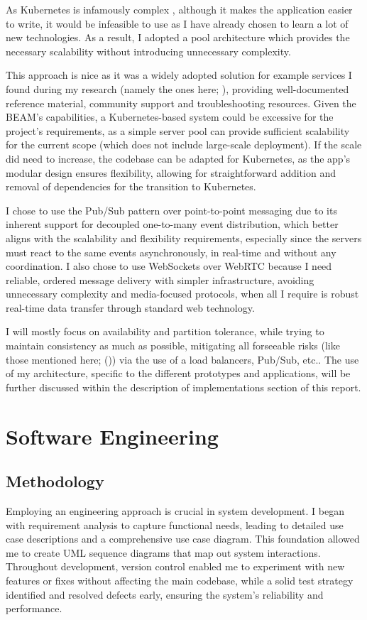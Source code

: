 \documentclass[]{final}
\begin{document}
As Kubernetes is infamously complex \cite{noauthor_why_nodate}, although it makes the application easier
to write, it would be infeasible to use as I have already chosen to learn a
lot of new technologies. As a result, I adopted a pool architecture which
provides the necessary scalability without introducing unnecessary complexity.

This approach is nice as it was a widely adopted solution for example
services I found during my research (namely the ones here; \cite{frost_making_2023, franchetti_coping_2020}), providing
well-documented reference material, community support and troubleshooting
resources.
Given the BEAM's capabilities, a Kubernetes-based system could be excessive
for the project’s requirements, as a simple server pool can provide
sufficient scalability for the current scope (which does not include
large-scale deployment). If the scale did need to increase, the
codebase can be adapted for Kubernetes, as the app’s modular design
ensures flexibility, allowing for straightforward addition and removal of
dependencies for the transition to Kubernetes.

I chose to use the Pub/Sub pattern over point-to-point messaging due to
its inherent support for decoupled one-to-many event distribution, which
better aligns with the scalability and flexibility requirements,
especially since the servers must react to the same events asynchronously,
in real-time and without any coordination. I also chose to use WebSockets over
WebRTC because I need reliable, ordered message
delivery with simpler infrastructure, avoiding unnecessary complexity and
media-focused protocols, when all I require is robust real-time data
transfer through standard web technology.

I will mostly focus on availability and partition tolerance, while trying to
maintain consistency as much as possible,
mitigating all forseeable risks (like those mentioned here; {\hypersetup{linkcolor=teal}(\pageref{rationale_problem})}) via the use of
a load balancers, Pub/Sub, etc.. The use of my architecture, specific to
the different prototypes and applications, will be further discussed within the
description of implementations section of this report.

\chapter{Software Engineering}

\section{Methodology}
Employing an engineering approach is crucial in system development. I began with
requirement analysis to capture functional needs, leading to detailed use case
descriptions and a comprehensive use case diagram. This foundation allowed me to
create UML sequence diagrams that map out system interactions. Throughout development,
version control enabled me to experiment with new features or fixes without
affecting the main codebase, while a solid test strategy identified and resolved
defects early, ensuring the system's reliability and performance.
\end{document}
